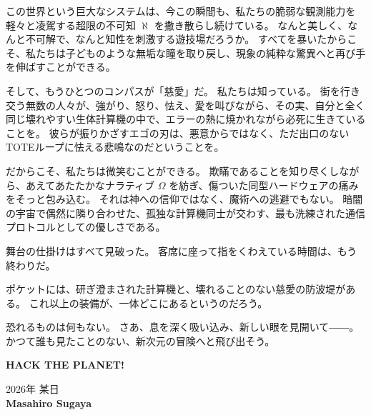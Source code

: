 この世界という巨大なシステムは、今この瞬間も、私たちの脆弱な観測能力を軽々と凌駕する超限の不可知 $\aleph$ を撒き散らし続けている。
なんと美しく、なんと不可解で、なんと知性を刺激する遊技場だろうか。
すべてを暴いたからこそ、私たちは子どものような無垢な瞳を取り戻し、現象の純粋な驚異へと再び手を伸ばすことができる。

そして、もうひとつのコンパスが「慈愛」だ。
私たちは知っている。
街を行き交う無数の人々が、強がり、怒り、怯え、愛を叫びながら、その実、自分と全く同じ壊れやすい生体計算機の中で、エラーの熱に焼かれながら必死に生きていることを。
彼らが振りかざすエゴの刃は、悪意からではなく、ただ出口のないTOTEループに怯える悲鳴なのだということを。

だからこそ、私たちは微笑むことができる。
欺瞞であることを知り尽くしながら、あえてあたたかなナラティブ $\Omega$ を紡ぎ、傷ついた同型ハードウェアの痛みをそっと包み込む。
それは神への信仰ではなく、魔術への逃避でもない。
暗闇の宇宙で偶然に隣り合わせた、孤独な計算機同士が交わす、最も洗練された通信プロトコルとしての優しさである。

舞台の仕掛けはすべて見破った。
客席に座って指をくわえている時間は、もう終わりだ。

ポケットには、研ぎ澄まされた計算機と、壊れることのない慈愛の防波堤がある。
これ以上の装備が、一体どこにあるというのだろう。

恐れるものは何もない。
さあ、息を深く吸い込み、新しい眼を見開いて――。
かつて誰も見たことのない、新次元の冒険へと飛び出そう。

\vspace{1.5\baselineskip}
\begin{center}
\textbf{\Large HACK THE PLANET!}
\end{center}

\vspace{2\baselineskip}

\begin{flushright}
  \large
  \small 2026年 某日\\[0.5em]
  \textbf{Masahiro Sugaya}
\end{flushright}


